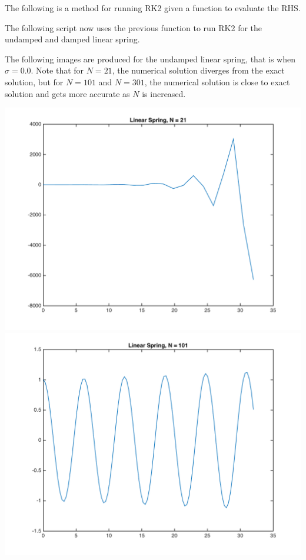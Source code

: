 \documentclass[11pt, oneside]{article}
\begin{document}
\begin{enumerate}
      The following is a method for running RK2 given a function to evaluate the RHS.\@
      

      The following script now uses the previous function to run RK2 for the
      undamped and damped linear spring.
      
      The following images are produced for the undamped linear spring, that is
      when $\sigma = 0.0$.
      Note that for $N = 21$, the numerical solution diverges from the exact solution, but
      for $N = 101$ and $N = 301$, the numerical solution is close to exact
      solution and gets more accurate as $N$ is increased.
      \begin{center}
        \includegraphics[scale=.4]{Figures/01_01.png}
        \includegraphics[scale=.4]{Figures/01_02.png}

\end{center}
\end{enumerate}
\end{document}
